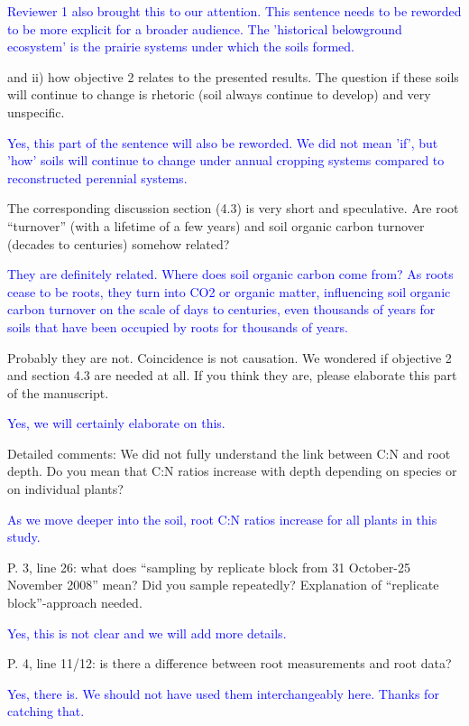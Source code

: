 \documentclass[]{article}
\begin{document}
\textcolor{blue}{Reviewer 1 also brought this to our attention. This sentence needs to be reworded to be more explicit for a broader audience. The 'historical belowground ecosystem' is the prairie systems under which the soils formed.}

and ii) how objective 2 relates to the presented results. The question
if these soils will continue to change is rhetoric (soil always continue
to develop) and very unspecific.

\textcolor{blue}{Yes, this part of the sentence will also be reworded. We did not mean 'if', but 'how' soils will continue to change under annual cropping systems compared to reconstructed perennial systems.}

The corresponding discussion section (4.3) is very short and
speculative. Are root ``turnover'' (with a lifetime of a few years) and
soil organic carbon turnover (decades to centuries) somehow related?

\textcolor{blue}{They are definitely related. Where does soil organic carbon come from? As roots cease to be roots, they turn into CO2 or organic matter, influencing soil organic carbon turnover on the scale of days to centuries, even thousands of years for soils that have been occupied by roots for thousands of years.}

Probably they are not. Coincidence is not causation. We wondered if
objective 2 and section 4.3 are needed at all. If you think they are,
please elaborate this part of the manuscript.

\textcolor{blue}{Yes, we will certainly elaborate on this.}

Detailed comments: We did not fully understand the link between C:N and
root depth. Do you mean that C:N ratios increase with depth depending on
species or on individual plants?

\textcolor{blue}{As we move deeper into the soil, root C:N ratios increase for all plants in this study.}

P. 3, line 26: what does ``sampling by replicate block from 31
October-25 November 2008'' mean? Did you sample repeatedly? Explanation
of ``replicate block''-approach needed.

\textcolor{blue}{Yes, this is not clear and we will add more details.}

P. 4, line 11/12: is there a difference between root measurements and
root data?

\textcolor{blue}{Yes, there is. We should not have used them interchangeably here. Thanks for catching that.}
\end{document}
